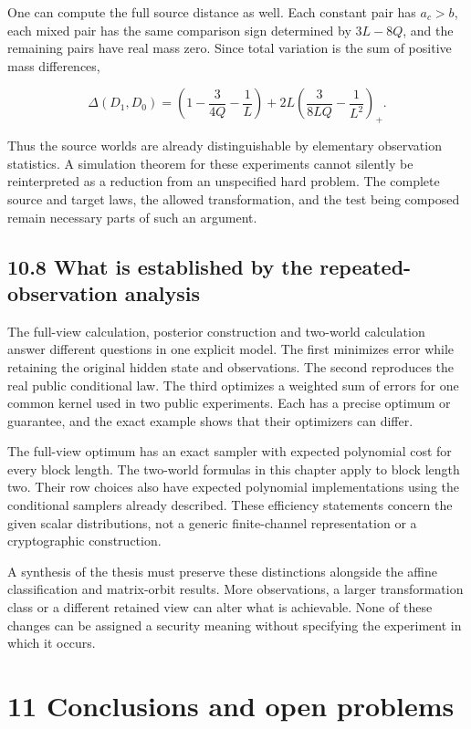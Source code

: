 \documentclass[
]{article}
\begin{document}
One can compute the full source distance as well. Each constant pair has
\(a_c>b\), each mixed pair has the same comparison sign determined by
\(3L-8Q\), and the remaining pairs have real mass zero. Since total
variation is the sum of positive mass differences,

\[
\Delta(D_1,D_0)=
\left(1-\frac3{4Q}-\frac1L\right)
+2L\left(\frac3{8LQ}-\frac1{L^2}\right)_+.
\]

Thus the source worlds are already distinguishable by elementary
observation statistics. A simulation theorem for these experiments
cannot silently be reinterpreted as a reduction from an unspecified hard
problem. The complete source and target laws, the allowed
transformation, and the test being composed remain necessary parts of
such an argument.

\subsection{10.8 What is established by the repeated-observation
analysis}\label{what-is-established-by-the-repeated-observation-analysis}

The full-view calculation, posterior construction and two-world
calculation answer different questions in one explicit model. The first
minimizes error while retaining the original hidden state and
observations. The second reproduces the real public conditional law. The
third optimizes a weighted sum of errors for one common kernel used in
two public experiments. Each has a precise optimum or guarantee, and the
exact example shows that their optimizers can differ.

The full-view optimum has an exact sampler with expected polynomial cost
for every block length. The two-world formulas in this chapter apply to
block length two. Their row choices also have expected polynomial
implementations using the conditional samplers already described. These
efficiency statements concern the given scalar distributions, not a
generic finite-channel representation or a cryptographic construction.

A synthesis of the thesis must preserve these distinctions alongside the
affine classification and matrix-orbit results. More observations, a
larger transformation class or a different retained view can alter what
is achievable. None of these changes can be assigned a security meaning
without specifying the experiment in which it occurs.

\section{11 Conclusions and open
problems}\label{conclusions-and-open-problems}
\end{document}

